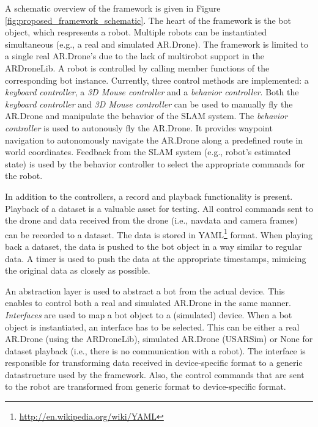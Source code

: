 A schematic overview of the framework is given in Figure \ref{fig:proposed_framework_schematic}.
The heart of the framework is the bot object, which respresents a robot.
Multiple robots can be instantiated simultaneous (e.g., a real and simulated AR.Drone).
The framework is limited to a single real AR.Drone's due to the lack of multirobot support in the ARDroneLib.
A robot is controlled by calling member functions of the corresponding bot instance.
Currently, three control methods are implemented: a \textit{keyboard controller}, a \textit{3D Mouse controller} and a \textit{behavior controller}.
Both the \textit{keyboard controller} and \textit{3D Mouse controller} can be used to manually fly the AR.Drone and manipulate the behavior of the SLAM system.
The \textit{behavior controller} is used to autonously fly the AR.Drone. 
It provides waypoint navigation to autonomously navigate the AR.Drone along a predefined route in world coordinates.
Feedback from the SLAM system (e.g., robot's estimated state) is used by the behavior controller to select the appropriate commands for the robot.

In addition to the controllers, a record and playback functionality is present.
Playback of a dataset is a valuable asset for testing.
All control commands sent to the drone and data received from the drone (i.e., navdata and camera frames) can be recorded to a dataset.
The data is stored in YAML\footnote{\url{http://en.wikipedia.org/wiki/YAML}} format.
When playing back a dataset, the data is pushed to the bot object in a way similar to regular data.
A timer is used to push the data at the appropriate timestamps, mimicing the original data as closely as possible.

An abstraction layer is used to abstract a bot from the actual device.
This enables to control both a real and simulated AR.Drone in the same manner.
\textit{Interfaces} are used to map a bot object to a (simulated) device.
When a bot object is instantiated, an interface has to be selected.
This can be either a real AR.Drone (using the ARDroneLib), simulated AR.Drone (USARSim) or None for dataset playback (i.e., there is no communication with a robot).
The interface is responsible for transforming data received in device-specific format to a generic datastructure used by the framework.
Also, the control commands that are sent to the robot are transformed from generic format to device-specific format.


